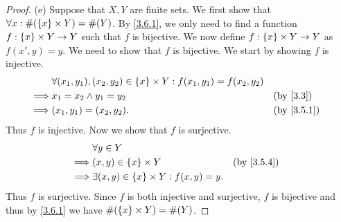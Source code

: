 \begin{proof}{(e)}
  Suppose that \(X, Y\) are finite sets.
  We first show that \(\forall x : \#(\left\lbrace x\right\rbrace \times Y) = \#(Y)\).
  By \cref{3.6.1}, we only need to find a function \(f : \left\lbrace x\right\rbrace \times Y \to Y\) such that \(f\) is bijective.
  We now define \(f : \left\lbrace x\right\rbrace \times Y \to Y\) as \(f(x', y) = y\).
  We need to show that \(f\) is bijective.
  We start by showing \(f\) is injective.
  \begin{align*}
             & \forall (x_1, y_1), (x_2, y_2) \in \set{x} \times Y : f(x_1, y_1) = f(x_2, y_2)                             \\
    \implies & x_1 = x_2 \land y_1 = y_2                                                       &  & \text{(by \cref{3.3})} \\
    \implies & (x_1, y_1) = (x_2, y_2).                                                        &  & \by{3.5.1}
  \end{align*}
  Thus \(f\) is injective.
  Now we show that \(f\) is surjective.
  \begin{align*}
             & \forall y \in Y                                                    \\
    \implies & (x, y) \in \set{x} \times Y                        &  & \by{3.5.4} \\
    \implies & \exists (x, y) \in \set{x} \times Y : f(x, y) = y.
  \end{align*}
  Thus \(f\) is surjective.
  Since \(f\) is both injective and surjective, \(f\) is bijective and thus by \cref{3.6.1} we have \(\#(\left\lbrace x\right\rbrace \times Y) = \#(Y)\).


\end{proof}
